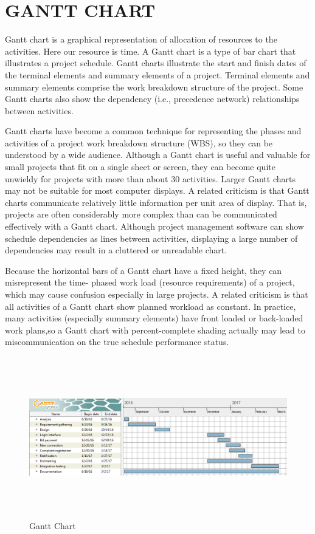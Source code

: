 \documentclass[12pt,a4paper,oneside]{report}
\begin{document}
\section{GANTT CHART}
\par Gantt chart is a graphical representation of allocation of resources to the activities. Here our resource is time. A Gantt chart is a type of bar chart that illustrates a project schedule. Gantt charts illustrate the start and ﬁnish dates of the terminal elements and summary elements of a project. Terminal elements and summary elements comprise the work breakdown structure of the project. Some Gantt charts also show the dependency (i.e., precedence network) relationships between activities. 
\par Gantt charts have become a common technique for representing the phases and activities of a project work breakdown structure (WBS), so they can be understood by a wide audience. Although a Gantt chart is useful and valuable for small projects that ﬁt on a single sheet or screen, they can become quite unwieldy for projects with more than about 30 activities. Larger Gantt charts may not be suitable for most computer displays. A related criticism is that Gantt charts communicate relatively little information per unit area of display. That is, projects are often considerably more complex than can be communicated effectively with a Gantt chart. Although project management software can show schedule dependencies as lines between activities, displaying a large number of dependencies may result in a cluttered or unreadable chart. \\
\par Because the horizontal bars of a Gantt chart have a fixed height, they can misrepresent the time- phased work load (resource requirements) of a project, which may cause confusion especially in large projects. A related criticism is that all activities of a Gantt chart show planned workload as constant. In practice, many activities (especially summary elements) have front loaded or back-loaded work plans,so a Gantt chart with percent-complete shading actually may lead to miscommunication on the true schedule performance status.
\begin{figure}[h]
	\begin{center}
		\includegraphics[width=16cm,height=7cm]{gantt.png}
			\caption{Gantt Chart}
			\label{Gantt Chart}
	\end{center}
\end{figure}
\end{document}
